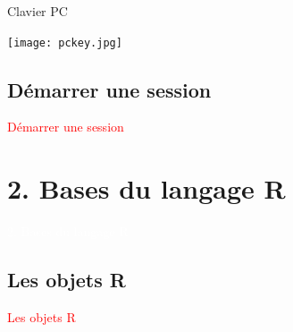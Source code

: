 \documentclass[11pt]{beamer}\usepackage[]{graphicx}\usepackage[]{color}
\begin{document}
\begin{frame}{Clavier PC}

\vspace{0.1in}

\begin{center}
\texttt{[image: pckey.jpg]}
\end{center}

\end{frame}








\subsection{D\'{e}marrer une session}

\begin{frame}
 \begin{center}
  \Huge{\textcolor{red}{D\'{e}marrer une session}}
 \end{center}
\end{frame}











\section{2. Bases du langage R}

\begin{frame}[plain]
\hspace*{-1.0cm}\parbox[t]{\textwidth}{
 \begin{center}
  \Huge{\textcolor{white}{2. Bases du langage R}}
 \end{center}
 }
\end{frame}

\subsection{Les objets R}

\begin{frame}
 \begin{center}
  \Huge{\textcolor{red}{Les objets R}}
 \end{center}
\end{frame}
\end{document}
